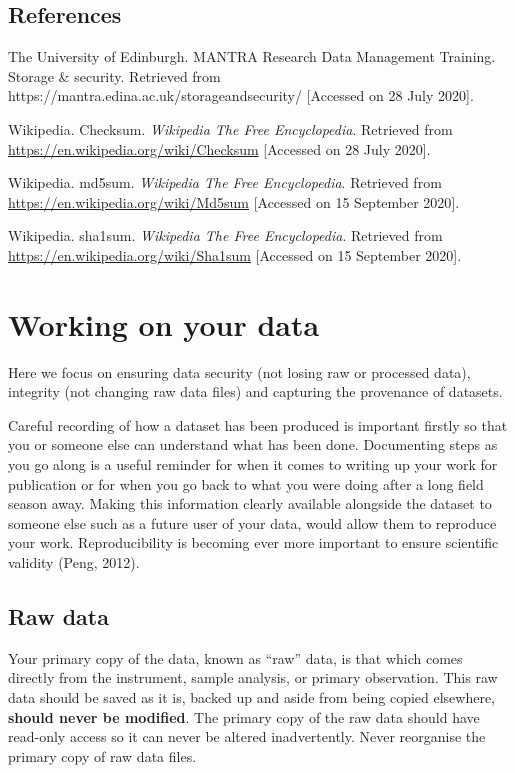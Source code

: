\documentclass[12pt,a4paper,oneside]{report}
\begin{document}
\hypertarget{references-4}{%
\section{References}\label{references-4}}

The University of Edinburgh. MANTRA Research Data Management Training.
Storage \& security. Retrieved from
https://mantra.edina.ac.uk/storageandsecurity/ {[}Accessed on 28 July
2020{]}.

Wikipedia. Checksum. \emph{Wikipedia The Free Encyclopedia}. Retrieved
from \url{https://en.wikipedia.org/wiki/Checksum} {[}Accessed on 28 July
2020{]}.

Wikipedia. md5sum. \emph{Wikipedia The Free Encyclopedia}. Retrieved
from \url{https://en.wikipedia.org/wiki/Md5sum} {[}Accessed on 15
September 2020{]}.

Wikipedia. sha1sum. \emph{Wikipedia The Free Encyclopedia}. Retrieved
from \url{https://en.wikipedia.org/wiki/Sha1sum} {[}Accessed on 15
September 2020{]}.

\hypertarget{working-on-your-data}{%
\chapter{Working on your data}\label{working-on-your-data}}

Here we focus on ensuring data security (not losing raw or processed
data), integrity (not changing raw data files) and capturing the
provenance of datasets.

Careful recording of how a dataset has been produced is important
firstly so that you or someone else can understand what has been done.
Documenting steps as you go along is a useful reminder for when it comes
to writing up your work for publication or for when you go back to what
you were doing after a long field season away. Making this information
clearly available alongside the dataset to someone else such as a future
user of your data, would allow them to reproduce your work.
Reproducibility is becoming ever more important to ensure scientific
validity (Peng, 2012).

\hypertarget{raw-data}{%
\section{Raw data}\label{raw-data}}

Your primary copy of the data, known as ``raw'' data, is that which
comes directly from the instrument, sample analysis, or primary
observation. This raw data should be saved as it is, backed up and aside
from being copied elsewhere, \textbf{should never be modified}. The
primary copy of the raw data should have read-only access so it can
never be altered inadvertently. Never reorganise the primary copy of raw
data files.
\end{document}
